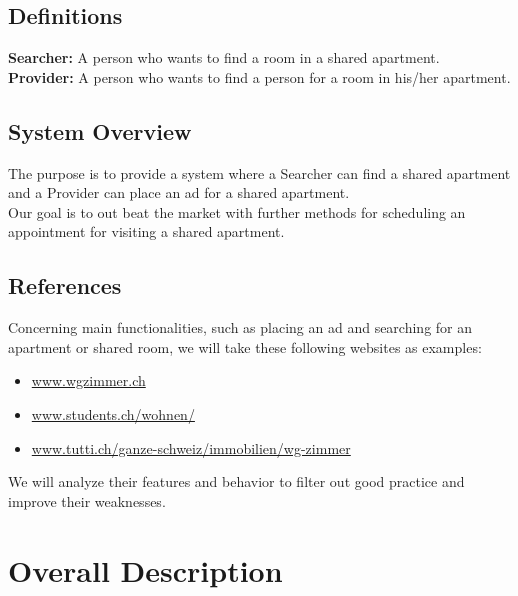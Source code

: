 \documentclass{scrreprt}
\begin{document}
\section{Definitions}
\textbf{Searcher:} A person who wants to find a room in a shared apartment.\\
\textbf{Provider:} A person who wants to find a person for a room in his/her apartment.
\section{System Overview}
The purpose is to provide a system where a Searcher can find a shared apartment and a Provider can place an ad for a shared apartment. \\
Our goal is to out beat the market with further methods for scheduling an appointment for visiting a shared apartment.
\section{References}
Concerning main functionalities, such as placing an ad and searching for an apartment or shared room, we will take these following websites as examples:\\
\begin{itemize}
\item \url{www.wgzimmer.ch}
\item \url{www.students.ch/wohnen/} 
\item \url{www.tutti.ch/ganze-schweiz/immobilien/wg-zimmer} 
\end{itemize}

We will analyze their features and behavior to filter out good practice and improve their weaknesses.
 
\chapter{Overall Description}
\end{document}

